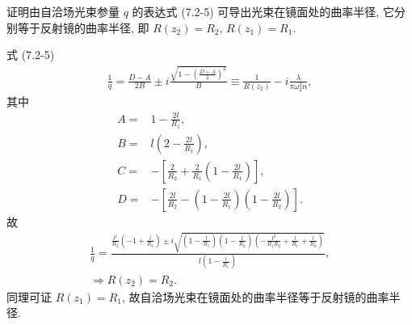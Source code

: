 \documentclass[twoside]{note}
\begin{document}
\begin{exe}
    证明由自洽场光束参量 $q$ 的表达式 (7.2-5) 可导出光束在镜面处的曲率半径, 它分别等于反射镜的曲率半径, 即 $R(z_2)=R_2$, $R(z_1)=R_1$.
\end{exe}
\begin{pf}
    式 (7.2-5)
    \begin{align}
        \frac{1}{q}=\frac{D-A}{2B}\pm i\frac{\sqrt{1-\left(\frac{D+A}{2}\right)^2}}{B}\equiv\frac{1}{R(z_2)}-i\frac{\lambda}{\pi\omega_2^2n},
    \end{align}
    其中
    \begin{align}
        A=&1-\frac{2l}{R_1},\\
        B=&l\left(2-\frac{2l}{R_1}\right),\\
        C=&-\left[\frac{2}{R_2}+\frac{2}{R_1}\left(1-\frac{2l}{R_1}\right)\right],\\
        D=&-\left[\frac{2l}{R_2}-\left(1-\frac{2l}{R_1}\right)\left(1-\frac{2l}{R_2}\right)\right].
    \end{align}
    故
    \begin{gather}
        \frac{1}{q}=\frac{\frac{l^2}{R_2}\left(-1+\frac{l}{R_1}\right)\pm i\sqrt{\left(1-\frac{l}{R_1}\right)\left(1-\frac{l}{R_2}\right)\left(-\frac{l^2}{R_1R_2}+\frac{l}{R_1}+\frac{l}{R_2}\right)}}{l\left(1-\frac{l}{R_1}\right)},\\
        \Longrightarrow R(z_2)=R_2.
    \end{gather}
    同理可证 $R(z_1)=R_1$, 故自洽场光束在镜面处的曲率半径等于反射镜的曲率半径.
\end{pf}
\end{document}
